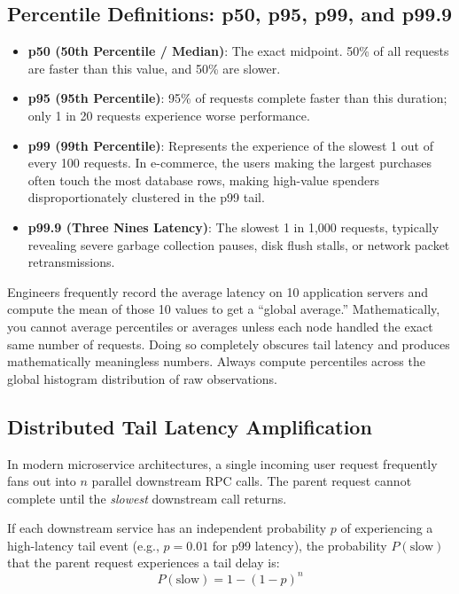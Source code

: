 \subsection{Percentile Definitions: p50, p95, p99, and p99.9}

\begin{itemize}[leftmargin=18pt]
  \item \textbf{p50 (50th Percentile / Median)}: The exact midpoint. 50\% of all requests are faster than this value, and 50\% are slower.
  \item \textbf{p95 (95th Percentile)}: 95\% of requests complete faster than this duration; only 1 in 20 requests experience worse performance.
  \item \textbf{p99 (99th Percentile)}: Represents the experience of the slowest 1 out of every 100 requests. In e-commerce, the users making the largest purchases often touch the most database rows, making high-value spenders disproportionately clustered in the p99 tail.
  \item \textbf{p99.9 (Three Nines Latency)}: The slowest 1 in 1,000 requests, typically revealing severe garbage collection pauses, disk flush stalls, or network packet retransmissions.
\end{itemize}

\begin{commonmistakebox}
Engineers frequently record the average latency on 10 application servers and compute the mean of those 10 values to get a ``global average.'' Mathematically, you cannot average percentiles or averages unless each node handled the exact same number of requests. Doing so completely obscures tail latency and produces mathematically meaningless numbers. Always compute percentiles across the global histogram distribution of raw observations.
\end{commonmistakebox}

\subsection{Distributed Tail Latency Amplification}

In modern microservice architectures, a single incoming user request frequently fans out into $n$ parallel downstream RPC calls. The parent request cannot complete until the \textit{slowest} downstream call returns.

If each downstream service has an independent probability $p$ of experiencing a high-latency tail event (e.g., $p = 0.01$ for p99 latency), the probability $P(\text{slow})$ that the parent request experiences a tail delay is:
\begin{equation}
P(\text{slow}) = 1 - (1 - p)^n
\end{equation}

